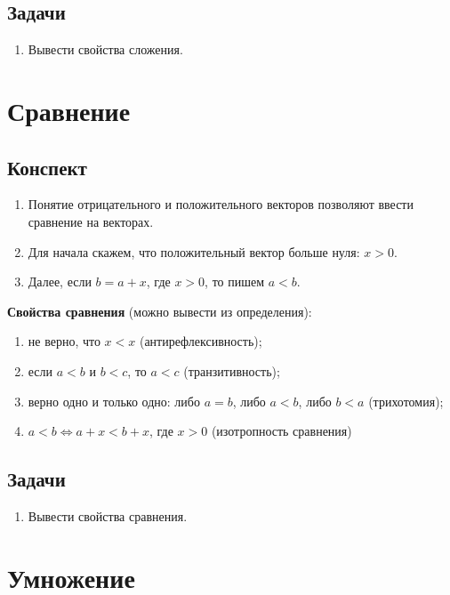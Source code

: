 \subsection{Задачи}
\begin{enumerate}
\item Вывести свойства сложения.
\end{enumerate}



\section{Сравнение}

\subsection{Конспект}
\begin{enumerate}
\item Понятие отрицательного и положительного векторов позволяют ввести сравнение на векторах.
\item Для начала скажем, что положительный вектор больше нуля: $x>0$.
\item Далее, если $b=a+x$, где $x>0$, то пишем $a<b$.
\end{enumerate}

\textbf{Свойства сравнения} (можно вывести из определения):
\begin{enumerate}[label=O\arabic*]
\item не верно, что $x<x$ (антирефлексивность);
\item если $a<b$ и $b<c$, то $a<c$ (транзитивность);
\item верно одно и только одно: либо $a=b$, либо $a<b$, либо $b<a$ (трихотомия);
\item $a<b\Leftrightarrow a+x<b+x$, где $x>0$ (изотропность сравнения)
\end{enumerate}

\subsection{Задачи}
\begin{enumerate}
\item Вывести свойства сравнения.
\end{enumerate}





\section{Умножение}

